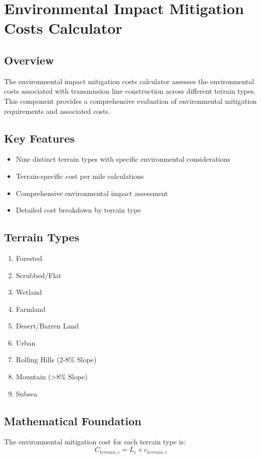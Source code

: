 \documentclass[12pt]{article}
\begin{document}
\section{Environmental Impact Mitigation Costs Calculator}

\subsection{Overview}
The environmental impact mitigation costs calculator assesses the environmental costs associated with transmission line construction across different terrain types. This component provides a comprehensive evaluation of environmental mitigation requirements and associated costs.

\subsection{Key Features}
\begin{itemize}
    \item Nine distinct terrain types with specific environmental considerations
    \item Terrain-specific cost per mile calculations
    \item Comprehensive environmental impact assessment
    \item Detailed cost breakdown by terrain type
\end{itemize}

\subsection{Terrain Types}
\begin{enumerate}
    \item Forested
    \item Scrubbed/Flat
    \item Wetland
    \item Farmland
    \item Desert/Barren Land
    \item Urban
    \item Rolling Hills (2-8\% Slope)
    \item Mountain (>8\% Slope)
    \item Subsea
\end{enumerate}

\subsection{Mathematical Foundation}
The environmental mitigation cost for each terrain type is:
\begin{equation}
C_{terrain,i} = L_i \times c_{terrain,i}
\end{equation}
\end{document}
